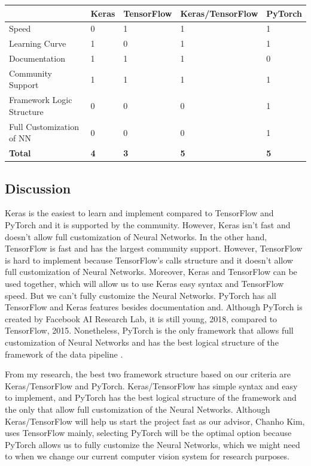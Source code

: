 \documentclass[onecolumn, draftclsnofoot,10pt, compsoc]{IEEEtran}
\begin{document}
\begin{center}
\begin{tabular}{|l|l|l|l|l|}
\hline
           & \textbf{Keras} & \textbf{TensorFlow} & \textbf{Keras/TensorFlow} & \textbf{PyTorch}\\ \hline
Speed &     0      &      1     &      1     &      1          \\ \hline
Learning Curve &     1     &     0      &      1       &    1       \\ \hline
Documentation &     1     &     1      &      1       &    0       \\ \hline
Community Support &      1     &     1      &   1            &     1      \\ \hline
Framework Logic Structure &      0     &     0      &   0            &     1      \\ \hline
Full Customization of NN &      0     &     0      &   0            &     1      \\ \hline
\textbf{Total} &      \textbf{4}     &   \textbf{3}        &      \textbf{5}     &     \textbf{5}  \\
\hline
\end{tabular}
\end{center}

\subsection{Discussion}
Keras is the easiest to learn and implement compared to TensorFlow and PyTorch and it is supported by the community. However, Keras isn't fast and doesn't allow full customization of Neural Networks. In the other hand, TensorFlow is fast and has the largest community support. However, TensorFlow is hard to implement because TensorFlow's calls structure and it doesn't allow full customization of Neural Networks. Moreover, Keras and TensorFlow can be used together, which will allow us to use Keras easy syntax and TensorFlow speed. But we can't fully customize the Neural Networks. PyTorch has all TensorFlow and Keras features besides documentation and. Although PyTorch is created by Facebook AI Research Lab, it is still young, 2018, compared to TensorFlow, 2015. Nonetheless, PyTorch is the only framework that allows full customization of Neural Networks and has the best logical structure of the framework of the data pipeline \cite{dlf1} \cite{dlf2} \cite{dlf3}.

From my research, the best two framework structure based on our criteria are Keras/TensorFlow and PyTorch. Keras/TensorFlow has simple syntax and easy to implement, and PyTorch has the best logical structure of the framework and the only that allow full customization of the Neural Networks. Although Keras/TensorFlow will help us start the project fast as our advisor, Chanho Kim, uses TensorFlow mainly, selecting PyTorch will be the optimal option because PyTorch allows us to fully customize the Neural Networks, which we might need to when we change our current computer vision system for research purposes. 
\end{document}

